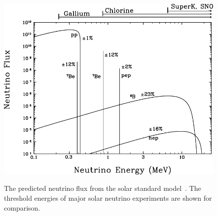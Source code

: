 \begin{figure}
	\begin{minipage}[t]{0.48\textwidth}
		\includegraphics[width=\textwidth]{pics/BahcallNuFlux.pdf}
		\caption{The predicted neutrino flux from the solar standard model~\cite{Bahcall:2004mz}.
			The threshold energies of major solar neutrino experiments are shown for comparison.}
		\label{fig:solar_nu_flux}
	\end{minipage}
	\hfill
	\begin{minipage}[t]{0.5\textwidth}
		\centering
		\label{fig:borex}
	\end{minipage}
\end{figure}

